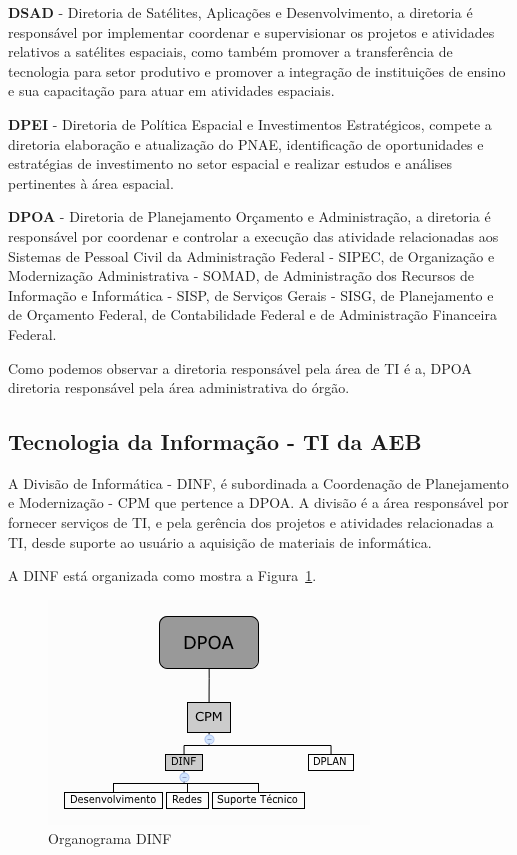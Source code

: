 \textbf{DSAD} - Diretoria de Satélites, Aplicações e Desenvolvimento, a diretoria é responsável por implementar coordenar e supervisionar os projetos e atividades relativos a satélites espaciais, como também promover a transferência de tecnologia para setor produtivo e promover a integração de instituições de ensino e sua capacitação para atuar em atividades espaciais.
 
\textbf{DPEI} - Diretoria de Política Espacial e Investimentos Estratégicos, compete a diretoria elaboração e atualização do PNAE, identificação de oportunidades e estratégias de investimento no setor espacial e realizar estudos e análises pertinentes à área espacial.

\textbf{DPOA} - Diretoria de Planejamento Orçamento e Administração, a diretoria é responsável por coordenar e controlar a execução das atividade relacionadas aos Sistemas de Pessoal Civil da Administração Federal - SIPEC, de Organização e Modernização Administrativa - SOMAD, de Administração dos Recursos de Informação e Informática - SISP, de Serviços Gerais - SISG, de Planejamento e de Orçamento Federal, de Contabilidade Federal e de Administração Financeira Federal.

Como podemos observar a diretoria responsável pela área de TI é a, DPOA diretoria responsável pela área administrativa do órgão.

\subsection{Tecnologia da Informação - TI da AEB}\label{sec:TIAEB}

A Divisão de Informática - DINF, é subordinada a Coordenação de Planejamento e Modernização - CPM que pertence a DPOA. A divisão é a área responsável por fornecer serviços de TI, e pela gerência dos projetos e atividades relacionadas a TI, desde suporte ao usuário a aquisição de materiais de informática.

A DINF está organizada como mostra a Figura~\ref{fig:orgDinf}.

\begin{figure}[ht]
\centering
\includegraphics[width=.7\textwidth]{DPOA_dinfAtual.png}
\caption{Organograma DINF}
\label{fig:orgDinf}
\end{figure}

